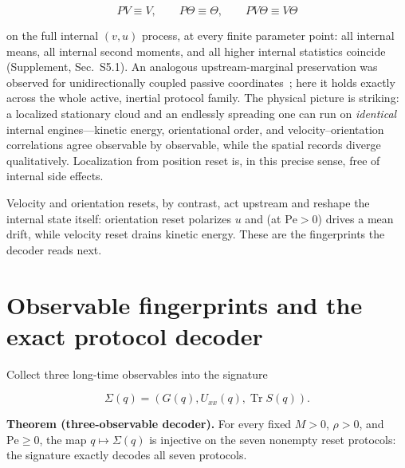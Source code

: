 \[
PV\equiv V,\qquad P\Theta\equiv\Theta,\qquad PV\Theta\equiv V\Theta
\]

on the full internal $(v,u)$ process, at every finite parameter point: all internal means, all internal second moments, and all higher internal statistics coincide (Supplement, Sec.~S5.1). An analogous upstream-marginal preservation was observed for unidirectionally coupled passive coordinates~\cite{ChakiOlsenLowen}; here it holds exactly across the whole active, inertial protocol family. The physical picture is striking: a localized stationary cloud and an endlessly spreading one can run on \emph{identical} internal engines---kinetic energy, orientational order, and velocity--orientation correlations agree observable by observable, while the spatial records diverge qualitatively. Localization from position reset is, in this precise sense, free of internal side effects.

Velocity and orientation resets, by contrast, act upstream and reshape the internal state itself: orientation reset polarizes $u$ and (at $\mathrm{Pe}>0$) drives a mean drift, while velocity reset drains kinetic energy. These are the fingerprints the decoder reads next.

\section{Observable fingerprints and the exact protocol decoder}\label{decoder}

Collect three long-time observables into the signature

\[
\Sigma(q)=(G(q),U_{xx}(q),\operatorname{Tr}S(q)).
\]

\textbf{Theorem (three-observable decoder).} For every fixed $M>0$, $\rho>0$, and $\mathrm{Pe}\ge0$, the map $q\mapsto\Sigma(q)$ is injective on the seven nonempty reset protocols: the signature exactly decodes all seven protocols.

